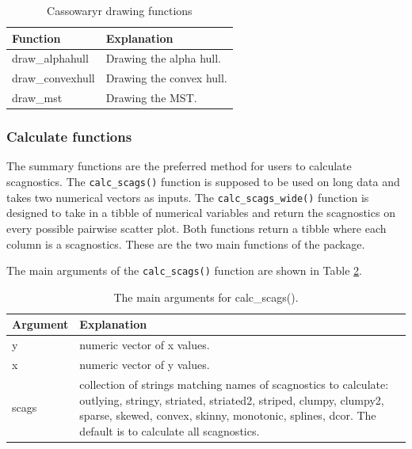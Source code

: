 \begin{table}

\caption{\label{tab:drawfuncs-tb-pdf}Cassowaryr drawing functions}
\centering
\begin{tabular}[t]{>{\raggedright\arraybackslash}p{3cm}l}
\toprule
Function & Explanation\\
\midrule
draw\_alphahull & Drawing the alpha hull.\\
draw\_convexhull & Drawing the convex hull.\\
draw\_mst & Drawing the MST.\\
\bottomrule
\end{tabular}
\end{table}

\subsubsection{Calculate functions}\label{calculate-functions}

The summary functions are the preferred method for users to calculate scagnostics. The \texttt{calc\_scags()} function is supposed to be used on long data and takes two numerical vectors as inputs. The \texttt{calc\_scags\_wide()} function is designed to take in a tibble of numerical variables and return the scagnostics on every possible pairwise scatter plot. Both functions return a tibble where each column is a scagnostics. These are the two main functions of the package.

The main arguments of the \texttt{calc\_scags()} function are shown in Table \ref{tab:calcfunc-tb-pdf}.

\begin{table}

\caption{\label{tab:calcfunc-tb-pdf}The main arguments for calc\_scags().}
\centering
\begin{tabular}[t]{l>{\raggedright\arraybackslash}p{12cm}}
\toprule
Argument & Explanation\\
\midrule
y & numeric vector of x values.\\
x & numeric vector of y values.\\
scags & collection of strings matching names of scagnostics to calculate: outlying, stringy, striated, striated2, striped, clumpy, clumpy2, sparse, skewed, convex, skinny, monotonic, splines, dcor. The default is to calculate all scagnostics.\\
\bottomrule
\end{tabular}
\end{table}

